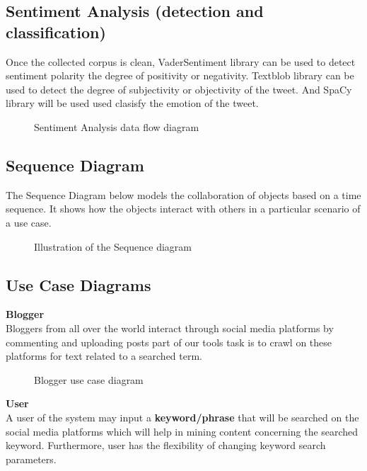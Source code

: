 \subsection{Sentiment Analysis (detection and classification)}
Once the collected corpus is clean, VaderSentiment library can be used to detect sentiment polarity the degree of positivity or negativity. Textblob library can be used to detect the degree of subjectivity or objectivity of the tweet. And SpaCy library will be used used clasisfy the emotion of the tweet.

\begin{figure}[h]
  \centering
  \caption[Sentiment Analysis data flow diagram]%
  {Sentiment Analysis data flow diagram}
  \label{fig:ALAP:sm1}
\end{figure}


\subsection{Sequence Diagram}
The Sequence Diagram below models the collaboration of objects based on a time sequence.
It shows how the objects interact with others in a particular scenario of a use case.

\begin{figure}[h]
  \centering
  \caption[Illustration of the Sequence diagram]%
  {Illustration of the Sequence diagram}
  \label{fig:ALAP:sm1}
\end{figure}


\subsection{Use Case Diagrams}
\textbf{Blogger}\\
Bloggers from all over the world interact through social media platforms by commenting and
uploading posts part of our tool\textquotesingle s task is to crawl on these platforms for text related to a searched term. 



\begin{figure}[h]
  \centering
  \caption[Blogger use case diagram]%
  {Blogger use case diagram}
  \label{fig:ALAP:sm1}
\end{figure}

\clearpage
\textbf{User}\\
A user of the system may input a \textbf{keyword/phrase} that will be searched on the social media platforms which will help in mining content concerning the searched keyword. Furthermore, user has the
flexibility of changing keyword search parameters.

